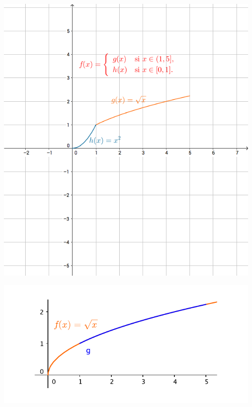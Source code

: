 \documentclass[a5paper, 12pt]{article}
\begin{document}
	\includegraphics[scale=0.45]{El_grafico}
	
	\includegraphics[scale=1]{El_grafico_2}
	
	
\end{document}
